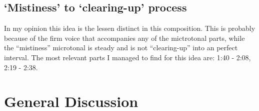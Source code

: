 \documentclass[a4paper,11pt]{article}
\begin{document}
\subsection*{‘Mistiness’ to ‘clearing-up’ process}

In my opinion this idea is the lessen distinct in this composition.
This is probably because of the firm voice that accompanies any of the mictrotonal parts, while the ``mistiness'' microtonal is steady and is not ``clearing-up'' into an perfect interval.
The most relevant parts I managed to find for this idea are: 1:40 - 2:08, 2:19 - 2:38.

\section{General Discussion}
\label{sec:general_discussion}

\printbibliography[title={Bibliography}]
\end{document}
